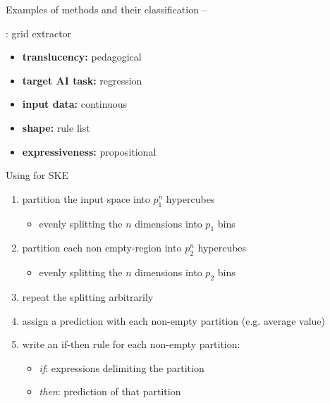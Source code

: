 \documentclass[presentation]{beamer}\mode<presentation>{\usetheme{AMSBolognaFC}}
\begin{document}
\begin{frame}[allowframebreaks]{Examples of methods and their classification -- \gridex}

    \begin{block}{\textbf{\gridex}: grid extractor}
        \begin{itemize}
            \item \textbf{translucency:} pedagogical
            \item \textbf{target AI task:} regression
            \item \textbf{input data:} continuous
            \item \textbf{shape:} rule list
            \item \textbf{expressiveness:} propositional
        \end{itemize}
    \end{block}

    

    \framebreak

    \begin{exampleblock}{Using \gridex{} for SKE}
        \begin{enumerate}
            \item \alert{partition} the input space into $p_1^n$ hypercubes
            \begin{itemize}
                \item evenly splitting the $n$ dimensions into $p_1$ bins
            \end{itemize}
            \item \alert{partition} each non empty-region into $p_2^n$ hypercubes
            \begin{itemize}
                \item evenly splitting the $n$ dimensions into $p_2$ bins
            \end{itemize}
            \item \alert{repeat} the splitting arbitrarily
            \item assign a \alert{prediction} with each non-empty partition (e.g. average value)
            \item write an \alert{if-then rule} for each non-empty partition:
            \begin{itemize}
                \item \emph{if}: expressions delimiting the partition
                \item \emph{then}: prediction of that partition
            \end{itemize}
        \end{enumerate}
    \end{exampleblock}

\end{frame}
\end{document}
